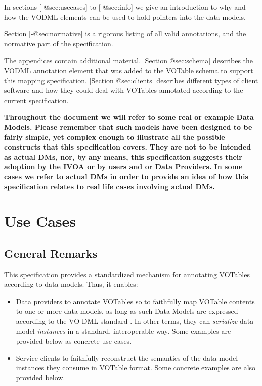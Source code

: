 \documentclass[11pt,a4paper]{ivoa}
\begin{document}
In sections {[}-@sec:usecases{]} to {[}-@sec:info{]} we give an
introduction to why and how the VODML elements can be used to hold
pointers into the data models.

Section {[}-@sec:normative{]} is a rigorous listing of all valid
annotations, and the normative part of the specification.

The appendices contain additional material. {[}Section @sec:schema{]}
describes the VODML annotation element that was added to the VOTable
schema to support this mapping specification. {[}Section @sec:clients{]}
describes different types of client software and how they could deal
with VOTables annotated according to the current specification.

\textbf{Throughout the document we will refer to some real or example
Data Models. Please remember that such models have been designed to be
fairly simple, yet complex enough to illustrate all the possible
constructs that this specification covers. They are not to be intended
as actual DMs, nor, by any means, this specification suggests their
adoption by the IVOA or by users and or Data Providers. In some cases we
refer to actual DMs in order to provide an idea of how this
specification relates to real life cases involving actual DMs.}

\section{Use Cases}\label{sec:usecases}

\subsection{General Remarks}\label{general-remarks}

This specification provides a standardized mechanism for annotating
VOTables according to data models. Thus, it enables:

\begin{itemize}
\itemsep1pt\parskip0pt
\item
  Data providers to annotate VOTables so to faithfully map VOTable
  contents to one or more data models, as long as such Data Models are
  expressed according to the VO-DML standard \citet{2018ivoa.spec.0910L}. In other
  terms, they can \emph{serialize} data model \emph{instances} in a
  standard, interoperable way. Some examples are provided below as
  concrete use cases.
\item
  Service clients to faithfully reconstruct the semantics of the data
  model instances they consume in VOTable format. Some concrete examples
  are also provided below.
\end{itemize}
\end{document}
